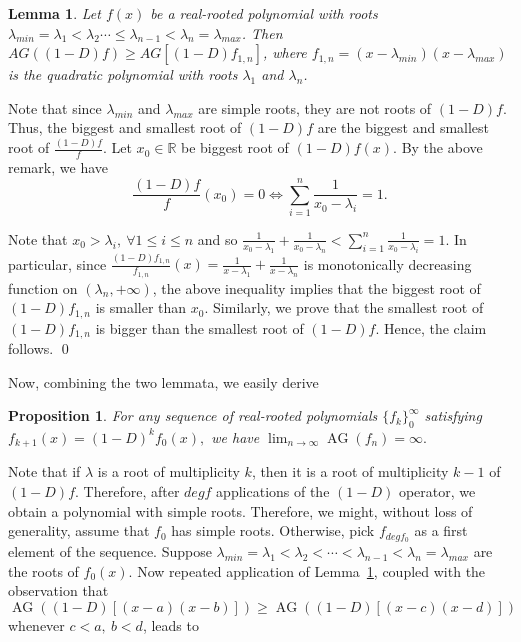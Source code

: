 \documentclass[11pt]{article}
\DeclareMathOperator{\AG}{AG}
\newtheorem{lemma}[theorem]{Lemma}
\newtheorem{proposition}[theorem]{Proposition}
\begin{document}
\begin{lemma}
\label{degree two - slowest movement}
Let $f(x)$ be a real-rooted polynomial with roots $\lambda_{min}=\lambda_1 < \lambda_2 \cdots \leq \lambda_{n-1} < \lambda_n = \lambda_{max}$. Then $AG((1-D)f) \geq AG[(1-D)f_{1,n}]$, where $f_{1,n} = (x - \lambda_{min})(x - \lambda_{max})$ is the quadratic polynomial with roots $\lambda_1$ and $\lambda_n$.
\end{lemma}
\proof Note that since $\lambda_{min}$ and $\lambda_{max}$ are simple roots, they are not roots of $(1-D)f$. Thus, the biggest and smallest root of $(1-D)f$ are the biggest and smallest root of $\frac{(1-D)f}{f}$. Let $x_0\in\mathbb{R}$ be biggest root of $(1-D)f(x)$. By the above remark, we have
\[\frac{(1-D)f}{f}(x_0) = 0 \Leftrightarrow \sum_{i=1}^n \frac{1}{x_0 - \lambda_i} = 1.\]

Note that $x_0 > \lambda_i,~\forall 1\leq i \leq n$ and so $\frac{1}{x_0 - \lambda_1} + \frac{1}{x_0 - \lambda_n} < \sum_{i=1}^n \frac{1}{x_0 - \lambda_i} = 1.$ In particular, since $\frac{(1-D)f_{1,n}}{f_{1,n}}(x) = \frac{1}{x - \lambda_1} + \frac{1}{x - \lambda_n}$ is monotonically decreasing function on $(\lambda_n, +\infty)$, the above inequality implies that the biggest root of $(1-D)f_{1,n}$ is smaller than $x_0$. Similarly, we prove that the smallest root of $(1-D)f_{1,n}$ is bigger than the smallest root of $(1-D)f$. Hence, the claim follows. \qed

Now, combining the two lemmata, we easily derive

\begin{proposition}For any sequence of real-rooted polynomials $\{f_k\}_0^{\infty}$ satisfying $f_{k+1}(x) = (1-D)^k f_{0}(x),$ we have $\lim_{n\to \infty} \AG(f_n) =  \infty.$
\end{proposition}
\label{avg gap goes to infty}
\proof Note that if $\lambda$ is a root of multiplicity $k$, then it is a root of multiplicity $k-1$ of $(1-D)f$. Therefore, after $deg f$ applications of the $(1-D)$ operator, we obtain a polynomial with simple roots. Therefore, we might, without loss of generality, assume that $f_0$ has simple roots. Otherwise, pick $f_{deg f_0}$ as a first element of the sequence. Suppose $\lambda_{min}=\lambda_1 < \lambda_2 < \cdots < \lambda_{n-1} < \lambda_n = \lambda_{max}$ are the roots of $f_0(x)$. Now repeated application of Lemma~\ref{degree two - slowest movement}, coupled with the observation that $\AG((1-D)[(x-a)(x-b)]) \geq \AG((1-D)[(x-c)(x-d)])$ whenever $c < a,~b<d$, leads to
\end{document}
